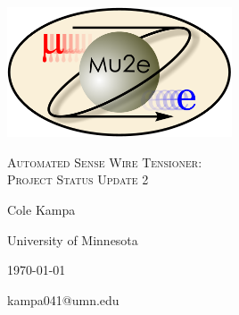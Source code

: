 \documentclass[letterpaper,12pt]{article}
\begin{document}
\begin{titlepage}
	\centering
	\includegraphics[width=0.5\textwidth]{mu2e_logo_oval.png}\par\vspace{2cm}
	{\scshape\LARGE Automated Sense Wire Tensioner: \\ Project Status Update 2\par}
	\vspace{3cm}
	{\Large Cole Kampa\par}
	\vspace{3.5cm}
	{\large University of Minnesota\par}
 	\vspace{.5cm}
	{\large \today \par}
	\vfill
	{kampa041@umn.edu\par}
\end{titlepage}

\clearpage
\setcounter{page}{2}
\end{document}
